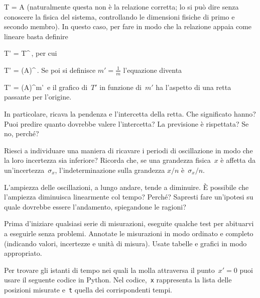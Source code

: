 \documentclass[12pt, a4paper]{physathome}   	%
\begin{document}
\beq
T = A
\eeq
(naturalmente questa non \`e la relazione corretta; lo si pu\`o dire senza conoscere la fisica del sistema, controllando le dimensioni fisiche di primo e secondo membro). In questo caso, per fare in modo che la relazione appaia come lineare basta definire

\beq
T' = T^{}\,,
\eeq
 per cui
 
 \beq
 T' = \left(A\right)^{}\,.
 \eeq
 Se poi si definisce $m'=\frac{1}{m}$ l'equazione diventa
 
 \beq
 T' = \left(A\right)^{}m'\,
 \eeq
 e il grafico di~$T'$ in funzione di~$m'$ ha l'aspetto di una retta passante per l'origine.

In particolare, ricava la pendenza e l'intercetta della retta. Che significato hanno? Puoi predire quanto dovrebbe valere l'intercetta? La previsione \`e rispettata? Se no, perch\'e?

Riesci a individuare una maniera di ricavare i periodi di oscillazione in modo che la loro incertezza sia inferiore? Ricorda che, se una grandezza fisica~$x$ \`e affetta da un'incertezza~$\sigma_x$, l'indeterminazione sulla grandezza $x/n$ \`e~$\sigma_x/n$.

L'ampiezza delle oscillazioni, a lungo andare, tende a diminuire. \`E possibile che l'ampiezza diminuisca linearmente col tempo? Perch\'e? Sapresti fare un'ipotesi su quale dovrebbe essere l'andamento, spiegandone le ragioni?

Prima d'iniziare qualsiasi serie di misurazioni, eseguite qualche test per abituarvi a eseguirle senza problemi. Annotate le misurazioni in modo ordinato e completo (indicando valori, incertezze e unit\`a di misura). Usate tabelle e grafici in modo appropriato.

\vfill\par\eject
{}
Per trovare gli istanti di tempo nei quali la molla attraversa il punto~$x'=0$ puoi usare il seguente codice in Python. Nel codice,~\lstinline{x} rappresenta la lista delle posizioni misurate e~\lstinline{t} quella dei corrispondenti tempi.
\end{document}
